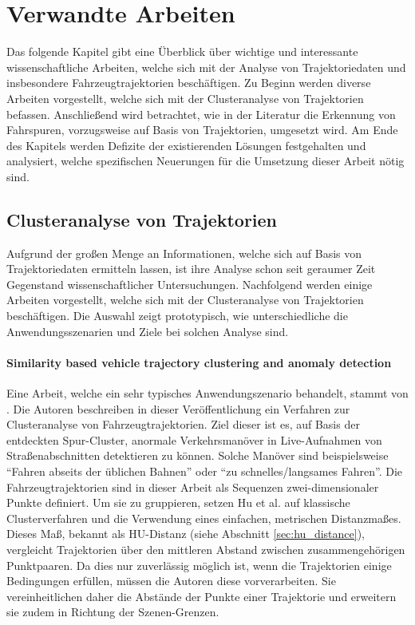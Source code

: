 ﻿%

\chapter{Verwandte Arbeiten}
\label{cha:related_work}

Das folgende Kapitel gibt eine Überblick über wichtige und interessante wissenschaftliche
Arbeiten, welche sich mit der Analyse von Trajektoriedaten und insbesondere Fahrzeugtrajektorien beschäftigen.
Zu Beginn werden diverse Arbeiten vorgestellt, welche sich mit der Clusteranalyse von Trajektorien befassen.
Anschließend wird betrachtet, wie in der Literatur die Erkennung von Fahrspuren, vorzugsweise auf Basis
von Trajektorien, umgesetzt wird.
Am Ende des Kapitels werden Defizite der existierenden Lösungen festgehalten und analysiert, welche
spezifischen Neuerungen für die Umsetzung dieser Arbeit nötig sind.

\section{Clusteranalyse von Trajektorien}
\label{sec:rw_clustering}

Aufgrund der großen Menge an Informationen, welche sich auf Basis von Trajektoriedaten ermitteln lassen, ist ihre
Analyse schon seit geraumer Zeit Gegenstand wissenschaftlicher Untersuchungen.
Nachfolgend werden einige Arbeiten vorgestellt, welche sich mit der Clusteranalyse von Trajektorien beschäftigen.
Die Auswahl zeigt prototypisch, wie unterschiedliche die Anwendungsszenarien und Ziele bei solchen Analyse sind.

\subsubsection*{Similarity based vehicle trajectory clustering and anomaly detection}
Eine Arbeit, welche ein sehr typisches Anwendungszenario behandelt, stammt von \cite[]{Hu2005}. Die Autoren
beschreiben in dieser Veröffentlichung ein Verfahren zur Clusteranalyse von Fahrzeugtrajektorien. Ziel dieser
ist es, auf Basis der entdeckten Spur-Cluster, anormale Verkehrsmanöver in Live-Aufnahmen von Straßenabschnitten
detektieren zu können. Solche Manöver sind beispielsweise ``Fahren abseits der üblichen Bahnen'' oder
``zu schnelles/langsames Fahren''.
Die Fahrzeugtrajektorien sind in dieser Arbeit als Sequenzen zwei-dimensionaler Punkte definiert.
Um sie zu gruppieren, setzen Hu et al. auf klassische Clusterverfahren und die Verwendung eines
einfachen, metrischen Distanzmaßes. Dieses Maß, bekannt als HU-Distanz (siehe Abschnitt \ref{sec:hu_distance}),
vergleicht Trajektorien über den mittleren Abstand zwischen zusammengehörigen Punktpaaren.
Da dies nur zuverlässig möglich ist, wenn die Trajektorien einige Bedingungen erfüllen, müssen die
Autoren diese vorverarbeiten. Sie vereinheitlichen daher die Abstände der Punkte einer Trajektorie und erweitern
sie zudem in Richtung der Szenen-Grenzen.

